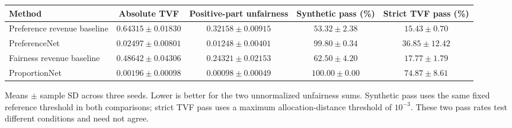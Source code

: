\begin{table}[!t]
\centering\footnotesize
{}
\label{tab:task-targets}
\setlength{\tabcolsep}{4pt}
\begin{tabular}{lcccc}
\toprule
Method & Absolute TVF & Positive-part unfairness & Synthetic pass (\%) & Strict TVF pass (\%) \\
\midrule
Preference revenue baseline & $0.64315\pm 0.01830$ & $0.32158\pm 0.00915$ & $53.32\pm 2.38$ & $15.43\pm 0.70$ \\
PreferenceNet & $0.02497\pm 0.00801$ & $0.01248\pm 0.00401$ & $99.80\pm 0.34$ & $36.85\pm 12.42$ \\
Fairness revenue baseline & $0.48642\pm 0.04306$ & $0.24321\pm 0.02153$ & $62.50\pm 4.20$ & $17.77\pm 1.79$ \\
ProportionNet & $0.00196\pm 0.00098$ & $0.00098\pm 0.00049$ & $100.00\pm 0.00$ & $74.87\pm 8.61$ \\
\bottomrule
\end{tabular}
\par\smallskip\begin{minipage}{0.98\textwidth}\footnotesize Means $\pm$ sample SD across three seeds. Lower is better for the two unnormalized unfairness sums. Synthetic pass uses the same fixed reference threshold in both comparisons; strict TVF pass uses a maximum allocation-distance threshold of $10^{-3}$. These two pass rates test different conditions and need not agree.\end{minipage}
\end{table}
